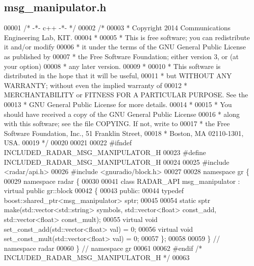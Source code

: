 \subsection{msg\+\_\+manipulator.\+h}
\label{msg__manipulator_8h_source}

\begin{DoxyCode}
00001 \textcolor{comment}{/* -*- c++ -*- */}
00002 \textcolor{comment}{/* }
00003 \textcolor{comment}{ * Copyright 2014 Communications Engineering Lab, KIT.}
00004 \textcolor{comment}{ * }
00005 \textcolor{comment}{ * This is free software; you can redistribute it and/or modify}
00006 \textcolor{comment}{ * it under the terms of the GNU General Public License as published by}
00007 \textcolor{comment}{ * the Free Software Foundation; either version 3, or (at your option)}
00008 \textcolor{comment}{ * any later version.}
00009 \textcolor{comment}{ * }
00010 \textcolor{comment}{ * This software is distributed in the hope that it will be useful,}
00011 \textcolor{comment}{ * but WITHOUT ANY WARRANTY; without even the implied warranty of}
00012 \textcolor{comment}{ * MERCHANTABILITY or FITNESS FOR A PARTICULAR PURPOSE.  See the}
00013 \textcolor{comment}{ * GNU General Public License for more details.}
00014 \textcolor{comment}{ * }
00015 \textcolor{comment}{ * You should have received a copy of the GNU General Public License}
00016 \textcolor{comment}{ * along with this software; see the file COPYING.  If not, write to}
00017 \textcolor{comment}{ * the Free Software Foundation, Inc., 51 Franklin Street,}
00018 \textcolor{comment}{ * Boston, MA 02110-1301, USA.}
00019 \textcolor{comment}{ */}
00020 
00021 
00022 \textcolor{preprocessor}{#ifndef INCLUDED\_RADAR\_MSG\_MANIPULATOR\_H}
00023 \textcolor{preprocessor}{#define INCLUDED\_RADAR\_MSG\_MANIPULATOR\_H}
00024 
00025 \textcolor{preprocessor}{#include <radar/api.h>}
00026 \textcolor{preprocessor}{#include <gnuradio/block.h>}
00027 
00028 \textcolor{keyword}{namespace }gr \{
00029   \textcolor{keyword}{namespace }radar \{
00030 
00041     \textcolor{keyword}{class }RADAR_API msg_manipulator : \textcolor{keyword}{virtual} \textcolor{keyword}{public} gr::block
00042     \{
00043      \textcolor{keyword}{public}:
00044       \textcolor{keyword}{typedef} boost::shared\_ptr<msg\_manipulator> sptr;
00045 
00054       \textcolor{keyword}{static} sptr make(std::vector<std::string> symbols, std::vector<float> const\_add, std::vector<float> 
      const\_mult);
00055       \textcolor{keyword}{virtual} \textcolor{keywordtype}{void} set\_const\_add(std::vector<float> val) = 0;
00056       \textcolor{keyword}{virtual} \textcolor{keywordtype}{void} set\_const\_mult(std::vector<float> val) = 0;
00057     \};
00058 
00059   \} \textcolor{comment}{// namespace radar}
00060 \} \textcolor{comment}{// namespace gr}
00061 
00062 \textcolor{preprocessor}{#endif }\textcolor{comment}{/* INCLUDED\_RADAR\_MSG\_MANIPULATOR\_H */}\textcolor{preprocessor}{}
00063 
\end{DoxyCode}
